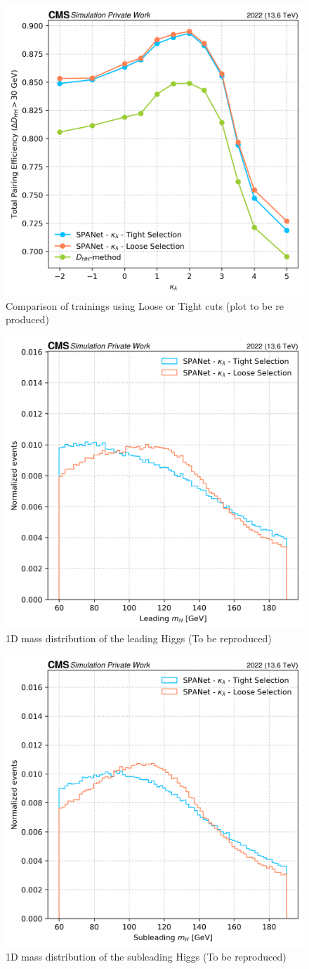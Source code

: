 \begin{figure}[hbt]
    \centering
    \includegraphics[width=0.6\linewidth]{Images/6.Improving/kappa lambda/loose vs tight.png}
    \caption{Comparison of trainings using Loose or Tight cuts (plot to be re produced)}
    \label{fig: loose vd tight}
\end{figure}

\begin{figure}[hbt]
    \centering
    \includegraphics[width=0.6\linewidth]{Images/6.Improving/kappa lambda/leading h mass sculp.png}
    \caption{1D mass distribution of the leading Higgs (To be reproduced)}
    \label{fig: leading H mass dist}
\end{figure}

\begin{figure}[hbt]
    \centering
    \includegraphics[width=0.6\linewidth]{Images/6.Improving/kappa lambda/sub leading H mass sculpt.png}
    \caption{1D mass distribution of the subleading Higgs (To be reproduced)}
    \label{fig: subleading H mass dist}
\end{figure}

